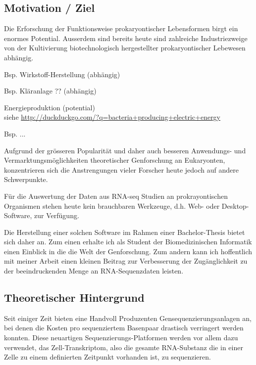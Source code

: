\documentclass[a4paper]{thesis}
\begin{document}
\subsection{Motivation / Ziel}

Die Erforschung der Funktionsweise prokaryontischer Lebensformen birgt ein
enormes Potential. Ausserdem sind bereits heute sind zahlreiche
Industriezweige von der Kultivierung biotechnologisch hergestellter
prokaryontischer Lebewesen abhängig.

\begin{list}{-}{}
 \item Bsp. Wirkstoff-Herstellung (abhängig)
 \item Bsp. Kläranlage ?? (abhängig)
 \item Energieproduktion (potential)
       \\siehe \url{http://duckduckgo.com/?q=bacteria+producing+electric+energy}
 \item Bsp. ... 
\end{list}

Aufgrund der grösseren Popularität und daher auch besseren
Anwendungs- und Vermarktungsmöglichkeiten theoretischer Genforschung an
Eukaryonten, konzentrieren sich die Anstrengungen vieler Forscher heute
jedoch auf andere Schwerpunkte.

Für die Auswertung der Daten aus RNA-seq Studien an prokrayontischen
Organismen stehen heute kein brauchbaren Werkzeuge, d.h.
Web- oder Desktop- Software, zur Verfügung.

Die Herstellung einer solchen Software im Rahmen einer Bachelor-Thesis
bietet sich daher an. Zum einen erhalte ich als Student der Biomedizinischen
Informatik einen Einblick in die die Welt der Genforschung. Zum andern kann ich
hoffentlich mit meiner Arbeit einen kleinen Beitrag zur Verbesserung der
Zugänglichkeit zu der beeindruckenden Menge an RNA-Sequenzdaten leisten.


\subsection{Theoretischer Hintergrund}

Seit einiger Zeit bieten eine Handvoll Produzenten Gensequenzierungsanlagen an,
bei denen die Kosten pro sequenziertem Basenpaar
drastisch verringert werden konnten. Diese neuartigen
Sequenzierungs-Platformen werden vor allem 
dazu verwendet, das Zell-Transkriptom, also die gesamte RNA-Substanz die
in einer Zelle zu einem definierten Zeitpunkt vorhanden ist, zu sequenzieren.
\end{document}
